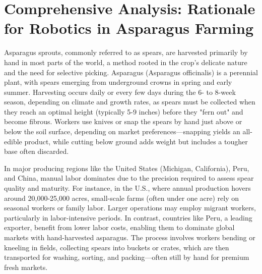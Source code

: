 \section{Comprehensive Analysis: Rationale for Robotics in Asparagus Farming}

Asparagus sprouts, commonly referred to as spears, are harvested primarily by hand in most parts of the world, a method rooted in the crop’s delicate nature and the need for selective picking. Asparagus (Asparagus officinalis) is a perennial plant, with spears emerging from underground crowns in spring and early summer. Harvesting occurs daily or every few days during the 6- to 8-week season, depending on climate and growth rates, as spears must be collected when they reach an optimal height (typically 5-9 inches) before they "fern out" and become fibrous. Workers use knives or snap the spears by hand just above or below the soil surface, depending on market preferences—snapping yields an all-edible product, while cutting below ground adds weight but includes a tougher base often discarded.


In major producing regions like the United States (Michigan, California), Peru, and China, manual labor dominates due to the precision required to assess spear quality and maturity. For instance, in the U.S., where annual production hovers around 20,000-25,000 acres, small-scale farms (often under one acre) rely on seasonal workers or family labor. Larger operations may employ migrant workers, particularly in labor-intensive periods. In contrast, countries like Peru, a leading exporter, benefit from lower labor costs, enabling them to dominate global markets with hand-harvested asparagus. The process involves workers bending or kneeling in fields, collecting spears into buckets or crates, which are then transported for washing, sorting, and packing—often still by hand for premium fresh markets.


